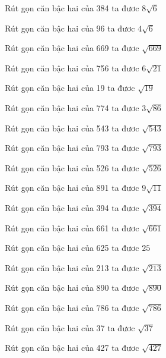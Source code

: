 \documentclass[12pt,a4paper]{article}
\begin{document}
\begin{ex}
Rút gọn căn bậc hai của 384 ta đươc $8\sqrt{6}$
\end{ex}
\begin{ex}
Rút gọn căn bậc hai của 96 ta đươc $4\sqrt{6}$
\end{ex}
\begin{ex}
Rút gọn căn bậc hai của 669 ta đươc $\sqrt{669}$
\end{ex}
\begin{ex}
Rút gọn căn bậc hai của 756 ta đươc $6\sqrt{21}$
\end{ex}
\begin{ex}
Rút gọn căn bậc hai của 19 ta đươc $\sqrt{19}$
\end{ex}
\begin{ex}
Rút gọn căn bậc hai của 774 ta đươc $3\sqrt{86}$
\end{ex}
\begin{ex}
Rút gọn căn bậc hai của 543 ta đươc $\sqrt{543}$
\end{ex}
\begin{ex}
Rút gọn căn bậc hai của 793 ta đươc $\sqrt{793}$
\end{ex}
\begin{ex}
Rút gọn căn bậc hai của 526 ta đươc $\sqrt{526}$
\end{ex}
\begin{ex}
Rút gọn căn bậc hai của 891 ta đươc $9\sqrt{11}$
\end{ex}
\begin{ex}
Rút gọn căn bậc hai của 394 ta đươc $\sqrt{394}$
\end{ex}
\begin{ex}
Rút gọn căn bậc hai của 661 ta đươc $\sqrt{661}$
\end{ex}
\begin{ex}
Rút gọn căn bậc hai của 625 ta đươc $25$
\end{ex}
\begin{ex}
Rút gọn căn bậc hai của 213 ta đươc $\sqrt{213}$
\end{ex}
\begin{ex}
Rút gọn căn bậc hai của 890 ta đươc $\sqrt{890}$
\end{ex}
\begin{ex}
Rút gọn căn bậc hai của 786 ta đươc $\sqrt{786}$
\end{ex}
\begin{ex}
Rút gọn căn bậc hai của 37 ta đươc $\sqrt{37}$
\end{ex}
\begin{ex}
Rút gọn căn bậc hai của 427 ta đươc $\sqrt{427}$
\end{ex}
\end{document}

